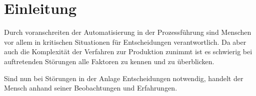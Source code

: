 
\chapter{Einleitung}
\label{sec:Einleitung}
Durch voranschreiten der Automatisierung in der Prozessführung sind Menschen vor allem in kritischen Situationen für Entscheidungen verantwortlich. Da aber auch die Komplexität der Verfahren zur Produktion zunimmt ist es schwierig bei auftretenden Störungen alle Faktoren zu kennen und zu überblicken.

Sind nun bei Störungen in der Anlage Entscheidungen notwendig, handelt der Mensch anhand seiner Beobachtungen und Erfahrungen. 